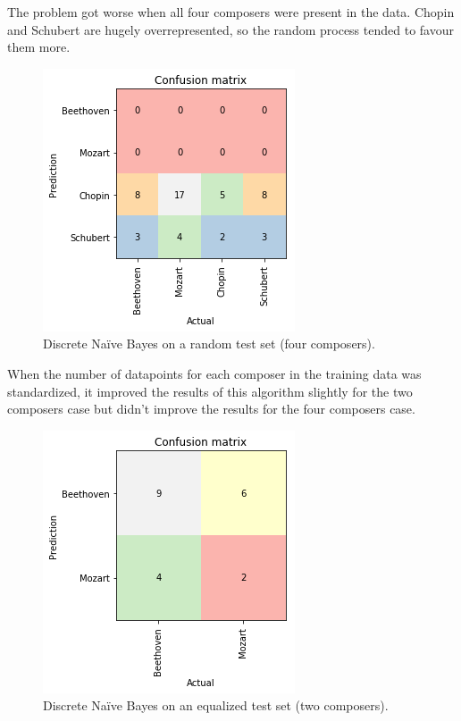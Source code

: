 \documentclass[11pt]{article}
\makeatletter
\def\maxwidth{\ifdim\Gin@nat@width>\linewidth\linewidth
    \else\Gin@nat@width\fi}
\let\Oldincludegraphics\includegraphics
\renewcommand{\includegraphics}[1]{\Oldincludegraphics[width=.8\maxwidth]{#1}}
\makeatother
\begin{document}
The problem got worse when all four composers were present in the data.
Chopin and Schubert are hugely overrepresented, so the random process
tended to favour them more.

\begin{figure}[htbp]
\centering
\includegraphics{report/plots/confusion_discNB_02.png}
\caption{Discrete Naïve Bayes on a random test set (four composers).}
\end{figure}

When the number of datapoints for each composer in the training data was
standardized, it improved the results of this algorithm slightly for the
two composers case but didn't improve the results for the four composers
case.

\begin{figure}[htbp]
\centering
\includegraphics{report/plots/confusion_discNB_03.png}
\caption{Discrete Naïve Bayes on an equalized test set (two composers).}
\end{figure}
\end{document}
